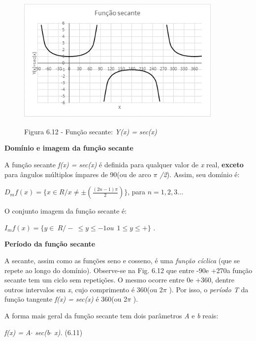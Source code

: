 \begin{figure}[H]
    \begin{Center}
        \includegraphics[width=3.95in,height=2.43in]{capitulos/trigonometria_e_funcoes_trigonometricas/media/image41.png}

        Figura 6.12 - Função secante: \textit{Y(x) = sec(x)}
    \end{Center}
\end{figure}

\textbf{Domínio e imagem da função secante}

A função secante \textit{f(x) = sec(x) }é definida para qualquer valor de \textit{x} real, \textbf{exceto} para ângulos múltiplos ímpares de 90\degree  (ou de arco \textit{$ \pi $ /2}). Assim, seu domínio é:

$D_{m}f(x) = \{x \in R / x \neq \pm (\frac{(2n-1)\pi}{2})\}$, para $n=1,2,3...$

O conjunto imagem da função secante é:

  \( I_{m}f \left( x \right) = \{ y \in ~R /  - ~ \leq  y  \leq  -1  ou~~ 1  \leq  y  \leq  + \}  \) .

\textbf{Período da função secante}

A secante, assim como as funções seno e cosseno, é uma \textit{função cíclica} (que se repete ao longo do domínio). Observe-se na Fig. 6.12 que entre -90\degree  e +270\degree a função secante tem um ciclo sem repetições. O mesmo ocorre entre 0\degree e +360\degree, dentre outros intervalos em \textit{x}, cujo comprimento é 360\degree (ou  2$ \pi $ ). Por isso, o \textit{período T} da função tangente  \textit{f(x) = sec(x) } é 360\degree (ou  2$ \pi $ ).

A forma mais geral da função secante tem dois parâmetros \textit{A }e\textit{ b} reais:

\textit{f(x) = A$ \cdot $ sec(b$ \cdot $ x).  \tab \tab \tab \tab \tab   }(6.11)

